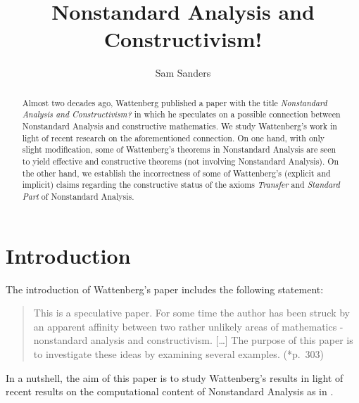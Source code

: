 \documentclass[reqno]{amsart}
\numberwithin{equation}{section}
\numberwithin{thm}{section}
\begin{document}
\title{Nonstandard Analysis and Constructivism!}
\author{Sam Sanders}
\address{Munich Center for Mathematical Philosophy, LMU Munich, Germany \& Department of Mathematics, Ghent University}
\begin{abstract}
Almost two decades ago, Wattenberg published a paper with the title \emph{Nonstandard Analysis and Constructivism?} in which he speculates on a possible connection between Nonstandard Analysis and constructive mathematics.   We study Wattenberg's work in light of recent research on the aforementioned connection.  On one hand, with only slight modification, some of Wattenberg's theorems in Nonstandard Analysis are seen to yield effective and constructive theorems (not involving Nonstandard Analysis).  On the other hand, we establish the incorrectness of some of Wattenberg's (explicit and implicit) claims regarding the  constructive status of the axioms \emph{Transfer} and \emph{Standard Part} of Nonstandard Analysis.  
\end{abstract}


\maketitle
\thispagestyle{empty}





\section{Introduction}\label{intro}
\noindent
The introduction of Wattenberg's paper \cite{watje} includes the following statement:
\begin{quote}
This is a speculative paper. For some time the author has been struck by an apparent affinity between two rather unlikely areas of mathematics - nonstandard analysis and constructivism. [\dots] 
The purpose of this paper is to investigate these ideas by examining several examples. (\cite{watje}*{p.\ 303})
\end{quote}
In a nutshell, the aim of this paper is to study Wattenberg's results in light of recent results on the computational content of Nonstandard Analysis as in \cites{samGH, samzoo, samzooII, sambon}.
\end{document}
